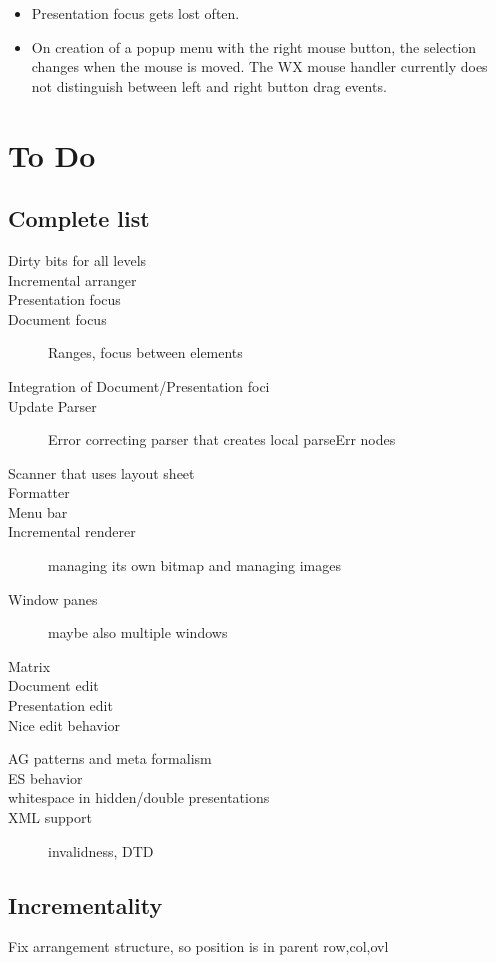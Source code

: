 \documentclass[]{article}
\begin{document}
\begin{itemize}
\item Presentation focus gets lost often.
\item On creation of a popup menu with the right mouse button, the selection changes when the mouse is moved. The WX mouse handler currently does not distinguish between left and right button drag events.
\end{itemize}


\section{To Do}
\subsection{Complete list}
\begin{description}
\item [Dirty bits for all levels]
\item [Incremental arranger]
\item [Presentation focus]
\item [Document focus]Ranges, focus between elements
\item [Integration of Document/Presentation foci]
\item [Update Parser] Error correcting parser that creates local parseErr nodes
\item [Scanner that uses layout sheet] 
\item [Formatter]
\item [Menu bar]
\item [Incremental renderer] managing its own bitmap and managing images
\item [Window panes] maybe also multiple windows
\item [Matrix]
\item [Document edit]
\item [Presentation edit]
\item [Nice edit behavior]
\end{description}

\begin{description}
\item [AG patterns and meta formalism]
\item [ES behavior]
\item [whitespace in hidden/double presentations]
\item [XML support] invalidness, DTD
\end{description}
\subsection{Incrementality}
Fix arrangement structure, so position is in parent row,col,ovl
\end{document}
